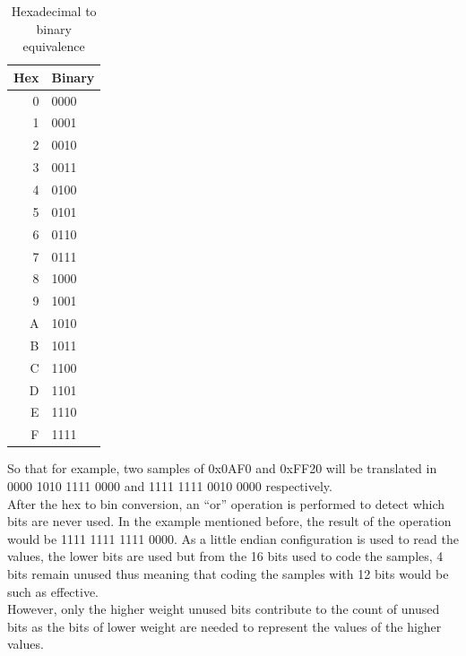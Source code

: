 \begin{table}[!ht]
	\renewcommand{\arraystretch}{1.50}
	\caption{Hexadecimal to binary equivalence}
	\label{tab:hexbin}
	\centering
	\begin{tabular}{ r | l }
	\hline
	\bfseries Hex & \bfseries Binary \\
	\hline
	\hline
	0 & 0000 \\
	\hline
	1 & 0001 \\
	\hline
	2 & 0010 \\
	\hline
	3 & 0011 \\
	\hline
	4 & 0100 \\
	\hline
	5 & 0101 \\
	\hline
	6 & 0110 \\
	\hline
	7 & 0111 \\
	\hline
	8 & 1000 \\
	\hline
	9 & 1001 \\
	\hline
	A & 1010 \\
	\hline
	B & 1011 \\
	\hline
	C & 1100 \\
	\hline
	D & 1101 \\
	\hline
	E & 1110 \\
	\hline
	F & 1111 \\
	\hline
	\end{tabular}
\end{table}
So that for example, two samples of 0x0AF0 and 0xFF20 will be translated in 0000 1010 1111 0000 and 1111 1111 0010 0000 respectively. \\
After the hex to bin conversion, an “or” operation is performed to detect which bits are never used. In the example mentioned before, the result of 
the operation would be 1111 1111 1111 0000. As a little endian configuration is used to read the values, the lower bits are used but from the 16 bits 
used to code the samples, 4 bits remain unused thus meaning that coding the samples with 12 bits would be such as effective. \\
However, only the higher weight unused bits contribute to the count of unused bits as the bits of lower weight are needed to represent the values 
of the higher values.

